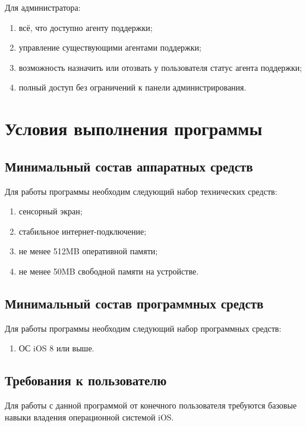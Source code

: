 \documentclass{../includes/TechDoc}
\begin{document}
    Для администратора:
    \begin{enumerate}[noitemsep]
        \item всё, что доступно агенту поддержки;
        \item управление существующими агентами поддержки;
        \item возможность назначить или отозвать у пользователя статус агента поддержки;
        \item полный доступ без ограничений к панели администрирования.
    \end{enumerate}


    \section{Условия выполнения программы}

    \subsection{Минимальный состав аппаратных средств}

    Для работы программы необходим следующий набор технических средств:
    \begin{enumerate}
        \item сенсорный экран;
        \item стабильное интернет-подключение;
        \item не менее 512MB оперативной памяти;
        \item не менее 50MB свободной памяти на устройстве.
    \end{enumerate}

    \subsection{Минимальный состав программных средств}

    Для работы программы необходим следующий набор программных средств:
    \begin{enumerate}
        \item ОС iOS 8 или выше.
    \end{enumerate}

    \subsection{Требования к пользователю}

    Для работы с данной программой от конечного пользователя требуются базовые навыки владения
    операционной системой iOS\@.
\end{document}
